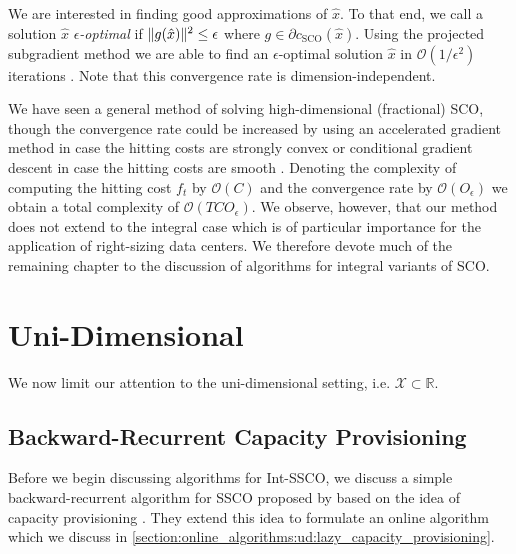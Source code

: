 We are interested in finding good approximations of $\hat{x}$. To that end, we call a solution $\hat{x}$ \emph{$\epsilon$-optimal} if $\lVert g(\hat{x})\rVert^2 \leq \epsilon$ where $g \in \partial c_{\text{SCO}}(\hat{x})$. Using the projected subgradient method we are able to find an $\epsilon$-optimal solution $\hat{x}$ in $\mathcal{O}(1 / \epsilon^2)$ iterations \cite{Boyd2003}. Note that this convergence rate is dimension-independent.

We have seen a general method of solving high-dimensional (fractional) SCO, though the convergence rate could be increased by using an accelerated gradient method in case the hitting costs are strongly convex or conditional gradient descent in case the hitting costs are smooth \cite{Bubeck2015}. Denoting the complexity of computing the hitting cost $f_t$ by $\mathcal{O}(C)$ and the convergence rate by $\mathcal{O}(O_{\epsilon})$ we obtain a total complexity of $\mathcal{O}(T C O_{\epsilon})$. We observe, however, that our method does not extend to the integral case which is of particular importance for the application of right-sizing data centers. We therefore devote much of the remaining chapter to the discussion of algorithms for integral variants of SCO.

\section{Uni-Dimensional}

We now limit our attention to the uni-dimensional setting, i.e. $\mathcal{X} \subset \mathbb{R}$.

\subsection{Backward-Recurrent Capacity Provisioning}\label{section:offline_algorithms:ud:capacity_provisioning}

Before we begin discussing algorithms for Int-SSCO, we discuss a simple backward-recurrent algorithm for SSCO proposed by \citeauthor*{Lin2011} based on the idea of capacity provisioning \cite{Lin2011}. They extend this idea to formulate an online algorithm which we discuss in \autoref{section:online_algorithms:ud:lazy_capacity_provisioning}.

